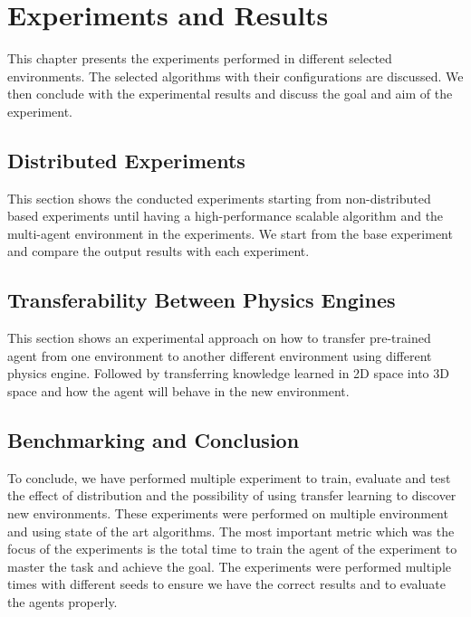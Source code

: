 
\chapter{Experiments and Results}\label{chapter:experiments}

This chapter presents the experiments performed in different selected environments. The selected algorithms with their configurations are discussed. We then conclude with the experimental results and discuss the goal and aim of the experiment.

\section{Distributed Experiments}

This section shows the conducted experiments starting from non-distributed based experiments until having a high-performance scalable algorithm and the multi-agent environment in the experiments. We start from the base experiment and compare the output results with each experiment.


\clearpage


\clearpage


\clearpage

\section{Transferability Between Physics Engines}

This section shows an experimental approach on how to transfer pre-trained agent from one environment to another different environment using different physics engine. Followed by transferring knowledge learned in 2D space into 3D space and how the agent will behave in the new environment.


\clearpage


\clearpage 

\section{Benchmarking and Conclusion}

To conclude, we have performed multiple experiment to train, evaluate and test the effect of distribution and the possibility of using transfer learning to discover new environments. These experiments were performed on multiple environment and using state of the art algorithms. The most important metric which was the focus of the experiments is the total time to train the agent of the experiment to master the task and achieve the goal. The experiments were performed multiple times with different seeds to ensure we have the correct results and to evaluate the agents properly.

